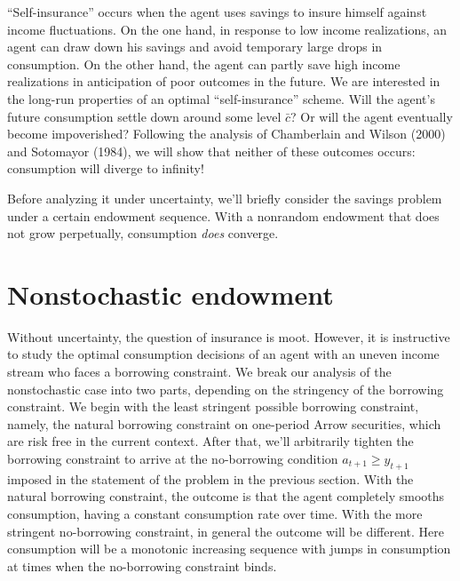 ``Self-insurance'' occurs when the agent uses savings to insure
himself against income fluctuations. On the one hand, in response
to low income realizations, an agent can draw down his savings and
avoid temporary large drops in consumption. On the other hand, the
agent can partly save high income realizations in anticipation of
poor outcomes in the future. We are interested in the long-run
properties of an optimal ``self-insurance'' scheme. Will the
agent's future consumption settle down around some level $\bar
c$?  Or will the agent eventually become
 impoverished? Following
the analysis of Chamberlain and Wilson (2000) and Sotomayor (1984),
we will show that neither of these outcomes occurs: consumption will diverge
to infinity! 

Before analyzing it under uncertainty, we'll briefly consider the savings
problem under a certain endowment sequence.  With a nonrandom endowment that
does not grow perpetually, consumption {\it does\/} converge.

\section{Nonstochastic endowment}

Without uncertainty, the question of insurance is moot.
However, it is instructive to study the optimal consumption decisions
of an agent with an uneven income stream who faces a borrowing constraint.
We break our analysis of the nonstochastic case into two parts,
depending on the stringency of the borrowing constraint.  We begin with
the least stringent possible borrowing constraint, namely, the natural
borrowing constraint on one-period Arrow securities, which are
risk free in the current context.  After that, we'll arbitrarily
tighten  the borrowing constraint to arrive at the no-borrowing
condition $a_{t+1} \geq y_{t+1}$
imposed in the statement of the problem in the previous section.
With the natural borrowing constraint, the outcome is that the agent completely
smooths consumption, having a constant consumption rate over time.  With the more
stringent no-borrowing constraint, in general the outcome will be different.  Here consumption
will be a monotonic increasing sequence with jumps in consumption at times when the no-borrowing constraint binds.

